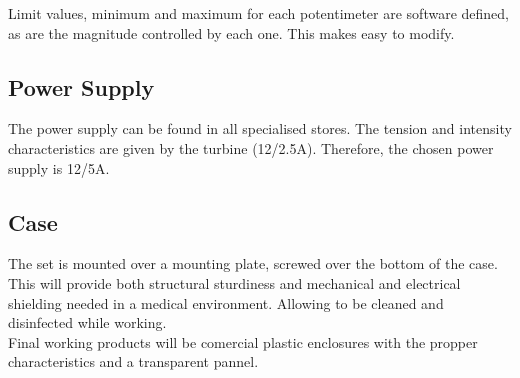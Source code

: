     Limit values,  minimum and maximum for each potentimeter are software defined, as are the magnitude controlled by each one. This makes easy to modify.
    
\subsection{Power Supply}
    The power supply can be found in all specialised stores. The tension and intensity characteristics are given by the turbine (12\Vcc/2.5A). Therefore, the chosen power supply is 12\Vcc/5A.
    
\subsection{Case}
    The set is mounted over a mounting plate, screwed over the bottom of the case. This will provide both structural sturdiness and mechanical and electrical shielding needed in a medical environment. Allowing to be cleaned and disinfected while working.\\ 
    
    Final working products will be comercial plastic enclosures with the propper characteristics and a transparent pannel.
